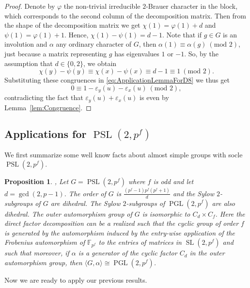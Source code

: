 \documentclass[11pt, a4paper]{amsart}
\newtheorem{proposition}[theorem]{Proposition}
\theoremstyle{definition}
\theoremstyle{definition}
\newcommand{\PSL}{{\operatorname{PSL}}}
\newcommand{\SL}{{\operatorname{SL}}}
\newcommand{\PGL}{{\operatorname{PGL}}}
\begin{document}
\begin{proof}
Denote by $\varphi$ the non-trivial irreducible $2$-Brauer character in the block, which corresponds to the second column of the decomposition matrix. Then from the shape of the decomposition matrix we get $\chi(1) = \varphi(1) + d$ and $\psi(1) = \varphi(1) + 1$. Hence, $\chi(1) - \psi(1) = d - 1$.
Note that if $g \in G$ is an involution and $\alpha$ any ordinary character of $G$, then $\alpha(1) \equiv \alpha(g)\ (\textrm{mod } 2)$, just because a matrix representing $g$ has eigenvalues $1$ or $-1$. So, by the assumption that $d\in\{0,2\}$, we obtain
\[\chi(y) -\psi(y) \equiv \chi(x) - \psi(x) \equiv d - 1 \equiv 1 \ (\textrm{mod } 2). \]
Substituting these congruences in \eqref{eq:ApplicationLemmaForD8} we thus get 
\[0 \equiv 1 - \varepsilon_y(u) - \varepsilon_x(u)  \ (\textrm{mod } 2),\]
contradicting the fact that $\varepsilon_y(u) + \varepsilon_x(u)$ is even by Lemma~\ref{lem:Congruence}.
\end{proof}

\subsection{Applications for $\PSL(2,p^f)$}

We first summarize some well know facts about almost simple groups with socle $\PSL(2,p^f)$.

\begin{proposition}\label{prop:OutPSL2}\cite[II, Hauptsatz 8.27]{HuppertI}, \cite[Section 3.3.4]{Wilson}
Let $G = \PSL(2,p^f)$ where $f$ is odd and let $d = \gcd(2,p-1)$. The order of $G$ is $\frac{(p^f-1)p^f(p^f+1)}{d}$ and the Sylow $2$-subgroups of $G$ are dihedral. The Sylow $2$-subgroups of $\PGL(2,p^f)$ are also dihedral. The outer automorphism group of $G$ is isomorphic to $C_d \times C_f$. Here the direct factor decomposition can be a realized such that the cyclic group of order $f$ is generated by the automorphism induced by the entry-wise application of the Frobenius automorphism of $\mathbb{F}_{p^f}$ to the entries of matrices in $\SL(2,p^f)$ and such that moreover, if $\alpha$ is a generator of the cyclic factor $C_d$ in the outer automorphism group, then $\langle G, \alpha \rangle \cong \PGL(2,p^f)$.
\end{proposition}

Now we are ready to apply our previous results.
\end{document}
